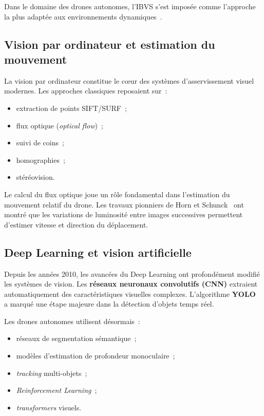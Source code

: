 \documentclass[12pt, a4paper, twoside, openright]{report}
\begin{document}
Dans le domaine des drones autonomes, l'IBVS s'est imposée comme l'approche la plus adaptée aux environnements dynamiques~\cite{chaumette2006visual}.

\subsection{Vision par ordinateur et estimation du mouvement}

La vision par ordinateur constitue le cœur des systèmes d'asservissement visuel modernes. Les approches classiques reposaient sur~:

\begin{itemize}
    \item extraction de points SIFT/SURF~;
    \item flux optique (\textit{optical flow})~;
    \item suivi de coins~;
    \item homographies~;
    \item stéréovision.
\end{itemize}

Le calcul du flux optique joue un rôle fondamental dans l'estimation du mouvement relatif du drone. Les travaux pionniers de Horn et Schunck~\cite{horn1981determining} ont montré que les variations de luminosité entre images successives permettent d'estimer vitesse et direction du déplacement.

\subsection{Deep Learning et vision artificielle}

Depuis les années 2010, les avancées du Deep Learning ont profondément modifié les systèmes de vision. Les \textbf{réseaux neuronaux convolutifs (CNN)} extraient automatiquement des caractéristiques visuelles complexes. L'algorithme \textbf{YOLO}~\cite{redmon2016you} a marqué une étape majeure dans la détection d'objets temps réel.

Les drones autonomes utilisent désormais~:

\begin{itemize}
    \item réseaux de segmentation sémantique~;
    \item modèles d'estimation de profondeur monoculaire~;
    \item \textit{tracking} multi-objets~;
    \item \textit{Reinforcement Learning}~;
    \item \textit{transformers} visuels.
\end{itemize}
\end{document}
